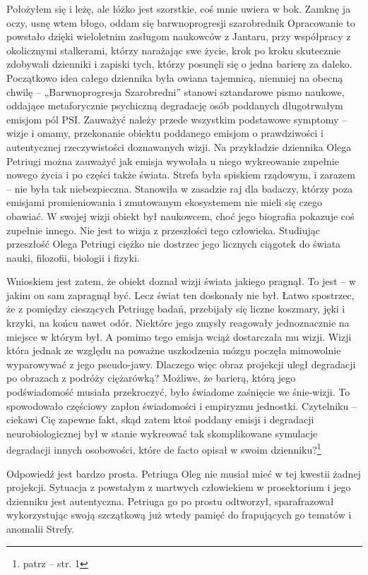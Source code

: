 \documentclass[../MAIN.tex]{subfiles}
\begin{document}
Położyłem się i leżę, ale łóżko jest szorstkie, coś mnie uwiera w bok. Zamknę ja oczy, usnę wtem błogo, oddam się barwnoprogresji szarobredni\3k
% 
% 
Opracowanie to powstało dzięki wieloletnim zasługom naukowców z Jantaru, przy współpracy z okolicznymi stalkerami, którzy narażając swe życie, krok po kroku skutecznie zdobywali dzienniki i zapiski tych, którzy posunęli się o jedna barierę za daleko. Początkowo idea całego dziennika była owiana tajemnicą, niemniej na obecną chwilę -- „Barwnoprogresja Szarobredni” stanowi sztandarowe pismo naukowe, oddające metaforycznie psychiczną degradację osób poddanych długotrwałym emisjom pól PSI. Zauważyć należy przede wszystkim podstawowe symptomy -- wizje i omamy, przekonanie obiektu poddanego emisjom o prawdziwości i autentycznej rzeczywistości doznawanych wizji. Na przykładzie dziennika Olega Petriugi można zauważyć jak emisja wywołała u niego wykreowanie zupełnie nowego życia i po części także świata. Strefa była spiskiem rządowym, i zarazem -- nie była tak niebezpieczna. Stanowiła w zasadzie raj dla badaczy, którzy poza emisjami promieniowania i zmutowanym ekosystemem nie mieli się czego obawiać. W swojej wizji 
obiekt był naukowcem, choć jego biografia pokazuje coś zupełnie innego. Nie jest to wizja z przeszłości tego człowieka. Studiując przeszłość Olega Petriugi ciężko nie dostrzec jego licznych ciągotek do świata nauki, filozofii, biologii i fizyki.

Wnioskiem jest zatem, że obiekt doznał wizji świata jakiego pragnął. To jest -- w jakim on sam zapragnął być. Lecz świat ten doskonały nie był. Łatwo spostrzec, że z pomiędzy cieszących Petriugę badań, przebijały się liczne koszmary, jęki i krzyki, na końcu nawet odór. Niektóre jego zmysły reagowały jednoznacznie na miejsce w którym był. A pomimo tego emisja wciąż dostarczała mu wizji. Wizji która jednak ze względu na poważne uszkodzenia mózgu poczęła mimowolnie wyparowywać z jego pseudo-jawy. Dlaczego więc obraz projekcji uległ degradacji po obrazach z podróży ciężarówką? Możliwe, że barierą, którą jego podświadomość musiała przekroczyć, było świadome zaśnięcie we śnie-wizji. To spowodowało częściowy zapłon świadomości i empiryzmu jednostki.
Czytelniku -- ciekawi Cię zapewne fakt, skąd zatem ktoś poddany emisji i degradacji neurobiologicznej był w stanie wykreować tak skomplikowane symulacje degradacji innych osobowości, które de facto opisał w swoim dzienniku?\footnote{patrz -- str. 1}

Odpowiedź jest bardzo prosta. Petriuga Oleg nie musiał mieć w tej kwestii żadnej projekcji. Sytuacja z powstałym z martwych człowiekiem w prosektorium i jego dzienniku jest autentyczna. Petriuga go po prostu odtworzył, sparafrazował wykorzystując swoją szczątkową już wtedy pamięć do frapujących go tematów i anomalii Strefy.
\end{document}
